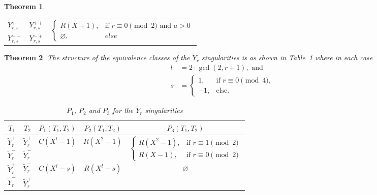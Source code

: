 \documentclass[noend]{amsproc}
\newtheorem{theorem}{Theorem}
\theoremstyle{definition}
\newcommand{\tY}{\widetilde{Y}}
\begin{document}
\begin{theorem}
\begin{table}[htb]
\begin{tabular}{|c|c||c|}
$Y_{r,s}^{+-}$ & $Y_{r,s}^{++}$ &
\multirow{2}{*}{$\begin{cases}
  R(X+1),      &\!\text{if } r \equiv 0 \pmod{2} \text{ and } a > 0 \\
  \varnothing, &else
\end{cases}$}
\\ \cline{1-2}

$Y_{r,s}^{--}$ & $Y_{r,s}^{-+}$ &
\\ \hline

\end{tabular}
\end{table}

\end{theorem}


\begin{theorem}
The structure of the equivalence classes of the $\tY_r$ singularities is as
shown in Table~\ref{tab:tYr_equivalences} where in each case
\begin{align*}
l &= 2\cdot{\gcd(2, r+1)}, \text{ and} \\
s &=
\begin{cases}
  1,  &\text{if } r \equiv 0 \pmod{4}, \\
  -1, &\text{else.}
\end{cases}
\end{align*}

\begin{table}[htb]
\centering
\caption{$P_1$, $P_2$ and $P_3$ for the $\tY_r$ singularities}
\label{tab:tYr_equivalences}
\begin{tabular}{|c|c||c|c|c|}
\hline

$T_1$ & $T_2$ & $P_1(T_1, T_2)$ & $P_2(T_1, T_2)$ & $P_3(T_1, T_2)$ \\
\hline\hline

$\tY_r^+$ & $\tY_r^+$ &
\multirow{2}{*}{$C(X^l-1)$} &
\multirow{2}{*}{$R(X^2-1)$} &
\multirow{2}{*}{$\begin{cases}
  R(X^2-1), &\text{if } r \equiv 1 \pmod{2} \\
  R(X-1),   &\text{if } r \equiv 0 \pmod{2}
\end{cases}$} \\
\cline{1-2}

$\tY_r^-$ & $\tY_r^-$ &
&
&
\\
\hline

$\tY_r^+$ & $\tY_r^-$ &
\multirow{2}{*}{$C(X^l-s)$} &
\multirow{2}{*}{$R(X^l-s)$} &
\multirow{2}{*}{$\varnothing$} \\
\cline{1-2}

$\tY_r^-$ & $\tY_r^+$ &
&
&
\\
\hline

\end{tabular}
\end{table}

\end{theorem}
\end{document}

